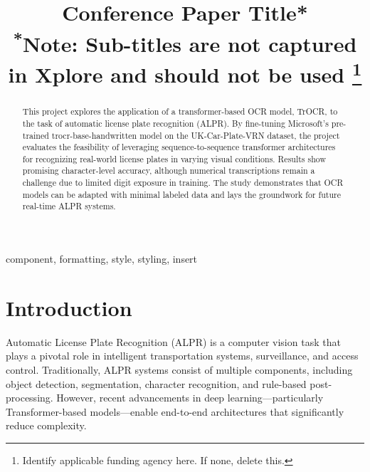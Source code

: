 \documentclass[conference]{IEEEtran}
\begin{document}
\title{Conference Paper Title*\\
{\footnotesize \textsuperscript{*}Note: Sub-titles are not captured in Xplore and
should not be used}
\thanks{Identify applicable funding agency here. If none, delete this.}
}

\author{

}

\maketitle

\begin{abstract}
This project explores the application of a transformer-based OCR model, TrOCR, to the task of automatic license plate recognition (ALPR). By fine-tuning Microsoft’s pre-trained trocr-base-handwritten model on the UK-Car-Plate-VRN dataset, the project evaluates the feasibility of leveraging sequence-to-sequence transformer architectures for recognizing real-world license plates in varying visual conditions. Results show promising character-level accuracy, although numerical transcriptions remain a challenge due to limited digit exposure in training. The study demonstrates that OCR models can be adapted with minimal labeled data and lays the groundwork for future real-time ALPR systems.


\end{abstract}

\begin{IEEEkeywords}
component, formatting, style, styling, insert
\end{IEEEkeywords}

\section{Introduction}
Automatic License Plate Recognition (ALPR) is a computer vision task that plays a pivotal role in intelligent transportation systems, surveillance, and access control. Traditionally, ALPR systems consist of multiple components, including object detection, segmentation, character recognition, and rule-based post-processing. However, recent advancements in deep learning—particularly Transformer-based models—enable end-to-end architectures that significantly reduce complexity.
\end{document}
